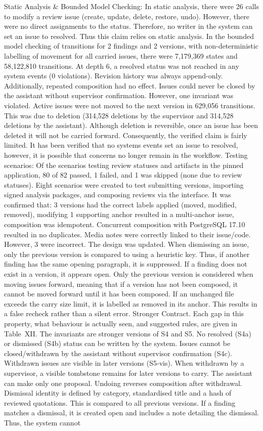 \documentclass[10pt,conference,letterpaper]{IEEEtran}
\begin{document}
Static Analysis \& Bounded Model Checking: In static analysis, there were 26 calls to modify a review issue (create, update, delete, restore, undo). However, there were no direct assignments to the status. Therefore, no writer in the system can set an issue to resolved. Thus this claim relies on static analysis. In the bounded model checking of transitions for 2 findings and 2 versions, with non-deterministic labelling of movement for all carried issues, there were 7,179,369 states and 58,122,810 transitions. At depth 6, a resolved status was not reached in any system events (0 violations). Revision history was always append-only. Additionally, repeated composition had no effect. Issues could never be closed by the assistant without supervisor confirmation. However, one invariant was violated. Active issues were not moved to the next version in 629,056 transitions. This was due to deletion (314,528 deletions by the supervisor and 314,528 deletions by the assistant). Although deletion is reversible, once an issue has been deleted it will not be carried forward. Consequently, the verified claim is fairly limited. It has been verified that no systems events set an issue to resolved, however, it is possible that concerns no longer remain in the workflow. Testing scenarios: Of the scenarios testing review statuses and artifacts in the pinned application, 80 of 82 passed, 1 failed, and 1 was skipped (none due to review statuses). Eight scenarios were created to test submitting versions, importing signed analysis packages, and composing reviews via the interface. It was confirmed that: 3 versions had the correct labels applied (moved, modified, removed), modifying 1 supporting anchor resulted in a multi-anchor issue, composition was idempotent. Concurrent composition with PostgreSQL 17.10 resulted in no duplicates. Media notes were correctly linked to their issue/code. However, 3 were incorrect. The design was updated. When dismissing an issue, only the previous version is compared to using a heuristic key. Thus, if another finding has the same opening paragraph, it is suppressed. If a finding does not exist in a version, it appears open. Only the previous version is considered when moving issues forward, meaning that if a version has not been composed, it cannot be moved forward until it has been composed. If an unchanged file exceeds the carry size limit, it is labelled as removed in its anchor. This results in a false recheck rather than a silent error. Stronger Contract. Each gap in this property, what behaviour is actually seen, and suggested rules, are given in Table~XII. The invariants are stronger versions of S4 and S5. No resolved (S4a) or dismissed (S4b) status can be written by the system. Issues cannot be closed/withdrawn by the assistant without supervisor confirmation (S4c). Withdrawn issues are visible in later versions (S5-vis). When withdrawn by a supervisor, a visible tombstone remains for later versions to carry. The assistant can make only one proposal. Undoing reverses composition after withdrawal. Dismissal identity is defined by category, standardised title and a hash of reviewed quotations. This is compared to all previous versions. If a finding matches a dismissal, it is created open and includes a note detailing the dismissal. Thus, the system cannot 
\end{document}

